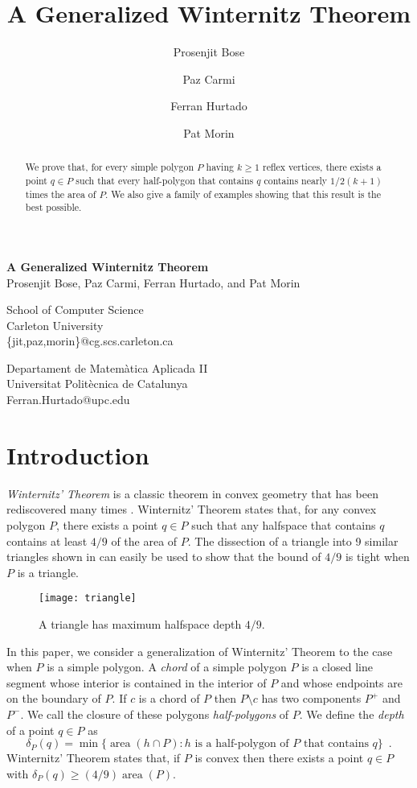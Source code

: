 \documentclass{article}
\title{A Generalized Winternitz Theorem}
\author{Prosenjit Bose \and
	Paz Carmi \and
	Ferran Hurtado \and
	Pat Morin}
\date{}
\DeclareMathOperator{\area}{area}
\begin{document}
\begin{center}
  \textbf{A Generalized Winternitz Theorem} \\
  Prosenjit Bose, Paz Carmi, Ferran Hurtado, and Pat Morin 
\end{center}
\begin{center}
  School of Computer Science \\ 
  Carleton University \\
  \{jit,paz,morin\}@cg.scs.carleton.ca
\end{center}
\begin{center}
  Departament de Matem\`atica Aplicada II \\
  Universitat Polit\`ecnica de Catalunya \\
  Ferran.Hurtado@upc.edu
\end{center}

\thispagestyle{empty}
\begin{abstract}
We prove that, for every simple polygon $P$ having $k\ge 1$ reflex
vertices, there exists a point $q\in P$ such that every half-polygon
that contains $q$ contains nearly $1/2(k+1)$ times the area of $P$.
We also give a family of examples showing that this result is the best
possible.
\end{abstract}

\section{Introduction}

\emph{Winternitz' Theorem} \cite[pp.~54--55]{b23} is a classic theorem
in convex geometry that has been rediscovered many times
\cite{e55b,ll35,n45,n58,yb51}.  Winternitz' Theorem states that, for
any convex polygon $P$, there exists a point $q\in P$ such that any
halfspace that contains $q$ contains at least $4/9$ of the area of
$P$.  The dissection of a triangle into 9 similar triangles shown in
 can easily be used to show that the bound of $4/9$
is tight when $P$ is a triangle.

\begin{figure}[htbp]
  \begin{center}
    \texttt{[image: triangle]}
  \end{center}
  \caption{A triangle has maximum halfspace depth $4/9$.}
\end{figure}


In this paper, we consider a generalization of Winternitz' Theorem to
the case when $P$ is a simple polygon.  A \emph{chord} of a simple
polygon $P$ is a closed line segment whose interior is contained in
the interior of $P$ and whose endpoints are on the boundary of $P$.
If $c$ is a chord of $P$ then $P\setminus c$ has two components $P^+$
and $P^-$.  We call the closure of these polygons \emph{half-polygons}
of $P$.  We define the \emph{depth} of a point $q\in P$ as 
\[
     \delta_P(q) = \min\{\area(h\cap P) : \mbox{$h$ is a half-polygon
	of $P$ that contains $q$} \} \enspace .
\]
Winternitz' Theorem states that, if $P$ is convex then there exists a
point $q\in P$ with $\delta_P(q)\ge (4/9)\area(P)$.  
\end{document}
